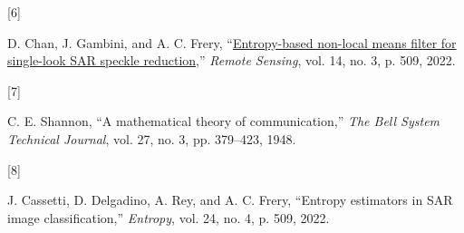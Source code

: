 \documentclass[
  lettersize  journal,
]{IEEEtran}%
\newlength{\cslhangindent}
\newlength{\csllabelwidth}
\newenvironment{CSLReferences}[2] %
 {\begin{list}{}{%
  \setlength{\itemindent}{0pt}
  \setlength{\leftmargin}{0pt}
  \setlength{\parsep}{0pt}
  \ifodd #1
   \setlength{\leftmargin}{\cslhangindent}
   \setlength{\itemindent}{-1\cslhangindent}
  \fi
  \setlength{\itemsep}{#2\baselineskip}}}
 {\end{list}}
\newcommand{\CSLLeftMargin}[1]{\parbox[t]{\csllabelwidth}{\strut#1\strut}}
\newcommand{\CSLRightInline}[1]{\parbox[t]{\linewidth - \csllabelwidth}{\strut#1\strut}}
\providecommand{\DIFaddbegin}{} %
\providecommand{\DIFaddend}{} %
\providecommand{\DIFdelbegin}{} %
\providecommand{\DIFdelend}{} %
\newcommand{\DIFscaledelfig}{0.5}
\newlength{\DIFdelgraphicswidth} %
\newlength{\DIFdelgraphicsheight} %
\newcommand{\DIFaddincludegraphics}[2][]{{\color{blue}\fbox{\DIFOincludegraphics[#1]{#2}}}} %
\newcommand{\DIFdelincludegraphics}[2][]{%
\sbox{\DIFdelgraphicsbox}{\DIFOincludegraphics[#1]{#2}}%
\settoboxwidth{\DIFdelgraphicswidth}{\DIFdelgraphicsbox} %
\settoboxtotalheight{\DIFdelgraphicsheight}{\DIFdelgraphicsbox} %
\scalebox{\DIFscaledelfig}{%
\parbox[b]{\DIFdelgraphicswidth}{\usebox{\DIFdelgraphicsbox}\\[-\baselineskip] \rule{\DIFdelgraphicswidth}{0em}}\llap{\resizebox{\DIFdelgraphicswidth}{\DIFdelgraphicsheight}{%
\setlength{\unitlength}{\DIFdelgraphicswidth}%
\begin{picture}(1,1)%
\thicklines\linethickness{2pt} %
{\color[rgb]{1,0,0}\put(0,0){\framebox(1,1){}}}%
{\color[rgb]{1,0,0}\put(0,0){\line( 1,1){1}}}%
{\color[rgb]{1,0,0}\put(0,1){\line(1,-1){1}}}%
\end{picture}%
}\hspace*{3pt}}} %
} %
\DeclareRobustCommand{\DIFaddbegin}{\DIFOaddbegin \let\includegraphics\DIFaddincludegraphics} %
\DeclareRobustCommand{\DIFaddend}{\DIFOaddend \let\includegraphics\DIFOincludegraphics} %
\DeclareRobustCommand{\DIFdelbegin}{\DIFOdelbegin \let\includegraphics\DIFdelincludegraphics} %
\DeclareRobustCommand{\DIFdelend}{\DIFOaddend \let\includegraphics\DIFOincludegraphics} %
\begin{document}
\begin{CSLReferences}{0}{0}
\DIFdelbegin {}
\DIFdelend \DIFaddbegin {}
\DIFaddend \CSLLeftMargin{{[}6{]} }%
\DIFdelbegin %
\DIFdelend \DIFaddbegin \CSLRightInline{D. Chan, J. Gambini, and A. C. Frery,
{``\href{https://doi.org/10.3390/rs14030509}{Entropy-based non-local
means filter for single-look SAR speckle reduction},''} \emph{Remote
Sensing}, vol. 14, no. 3, p. 509, 2022. }
\DIFaddend 

\DIFdelbegin {}
\DIFdelend \DIFaddbegin {}
\DIFaddend \CSLLeftMargin{{[}7{]} }%
\DIFdelbegin %
\DIFdelend \DIFaddbegin \CSLRightInline{C. E. Shannon, {``A mathematical theory of
communication,''} \emph{The Bell System Technical Journal}, vol. 27, no.
3, pp. 379--423, 1948. }
\DIFaddend 

\DIFdelbegin {}
\DIFdelend \DIFaddbegin {}
\DIFaddend \CSLLeftMargin{{[}8{]} }%
\DIFdelbegin %
\DIFdelend \DIFaddbegin \CSLRightInline{J. Cassetti, D. Delgadino, A. Rey, and A. C. Frery,
{``Entropy estimators in {SAR} image classification,''} \emph{Entropy},
vol. 24, no. 4, p. 509, 2022. }
\DIFaddend 


\end{CSLReferences}
\end{document}
